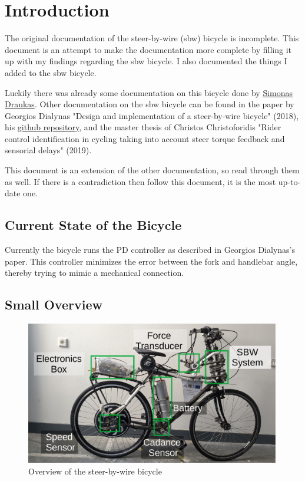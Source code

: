 \section{Introduction}
The original documentation of the steer-by-wire (sbw) bicycle is incomplete.
This document is an attempt to make the documentation more complete by filling it up with my findings regarding the sbw bicycle.
I also documented the things I added to the sbw bicycle.

Luckily there was already some documentation on this bicycle done by \href{https://github.com/mechmotum/TUDelft-SbW-Bicycle/tree/master/docs}{Simonas Draukas}.
Other documentation on the sbw bicycle can be found in the paper by Georgios Dialynas "Design and implementation of a steer-by-wire bicycle" (2018),
his \href{https://github.com/gdialynas/Steer-by-wire-bicycle}{github repository}, and the master thesis of Christos Christoforidis "Rider control identification in cycling taking into account steer torque feedback and sensorial delays" (2019). 

This document is an extension of the other documentation, so read through them as well.
If there is a contradiction then follow this document, it is the most up-to-date one.

\subsection{Current State of the Bicycle}
Currently the bicycle runs the PD controller as described in Georgios Dialynas's paper.
This controller minimizes the error between the fork and handlebar angle, thereby trying to mimic a mechanical connection.

\subsection{Small Overview}
\begin{figure}[h!]
    \centering
    \includegraphics[width=0.99\textwidth]{Img/Overview_of_bicycle.pdf}
    \caption{Overview of the steer-by-wire bicycle}
    \label{fig:sbw_overview}
\end{figure}